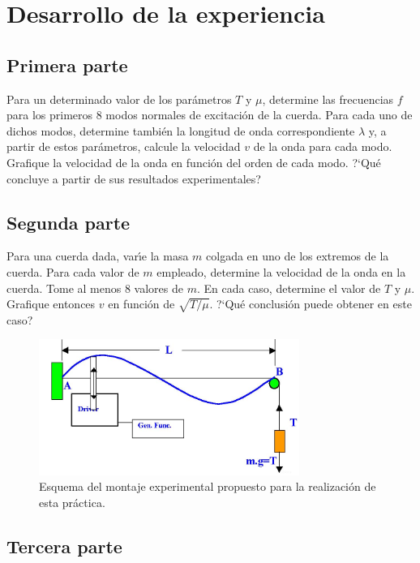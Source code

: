 \documentclass[laboratorio]{guia}
\begin{document}
\section{Desarrollo de la experiencia}

\subsection{Primera parte}
Para un determinado valor de los par\'ametros $T$ y $\mu$, determine las
frecuencias $f$ para los primeros 8 modos normales de excitaci\'on de la
cuerda. Para cada uno de dichos modos, determine tambi\'en la longitud de onda
correspondiente $\lambda$ y, a partir de estos par\'ametros, calcule la
velocidad $v$ de la onda para cada modo. Grafique la velocidad de la onda en
funci\'on del orden de cada modo. ?`Qu\'e concluye a partir de sus resultados
experimentales?

\subsection{Segunda parte}

Para una cuerda dada, var\'\i e la masa $m$ colgada en uno de los extremos de
la cuerda. Para cada valor de $m$ empleado, determine la velocidad de la onda
en la cuerda. Tome al menos 8 valores de $m$. En cada caso, determine el valor
de $T$ y $\mu$. Grafique entonces $v$ en funci\'on de $\sqrt{T/\mu}$. ?`Qu\'e
conclusi\'on puede obtener en este caso?

\begin{figure}[t!]
    \centering
    \includegraphics[width=8.5cm]{LG07--004.png}
    \caption{Esquema del montaje experimental propuesto para la realizaci\'on
    de esta pr\'actica.}
    \label{fig:1}
\end{figure}

\subsection{Tercera parte}
\end{document}
